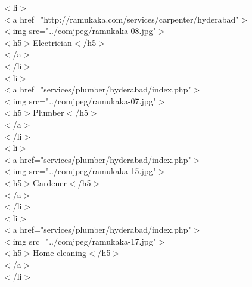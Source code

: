 \documentclass[12pt,a4paper]{report}
\begin{document}
\begin{titlepage}
{                                      $<$li$>$\\
                                             $<$a href="http://ramukaka.com/services/carpenter/hyderabad"$>$\\
                                                $<$img src="../comjpeg/ramukaka-08.jpg"$>$\\
                                                    $<$h5$>$Electrician$<$/h5$>$\\
                                             $<$/a$>$\\
                                     $<$/li$>$\\
                                     $<$li$>$\\
                                        $<$a href="services/plumber/hyderabad/index.php"$>$\\
                                               $<$img src="../comjpeg/ramukaka-07.jpg"$>$\\
                                                      $<$h5$>$Plumber$<$/h5$>$\\
                                        $<$/a$>$\\
                                     $<$/li$>$\\
                                     $<$li$>$\\
                                        $<$a href="services/plumber/hyderabad/index.php"$>$\\
                                               $<$img src="../comjpeg/ramukaka-15.jpg"$>$\\
                                                      $<$h5$>$Gardener$<$/h5$>$\\
                                        $<$/a$>$\\
                                     $<$/li$>$\\
                                     $<$li$>$\\
                                        $<$a href="services/plumber/hyderabad/index.php"$>$\\
                                               $<$img src="../comjpeg/ramukaka-17.jpg"$>$\\
                                                      $<$h5$>$Home cleaning$<$/h5$>$\\
                                        $<$/a$>$\\
                                     $<$/li$>$\\
                                     
}
\end{titlepage}
\end{document}

